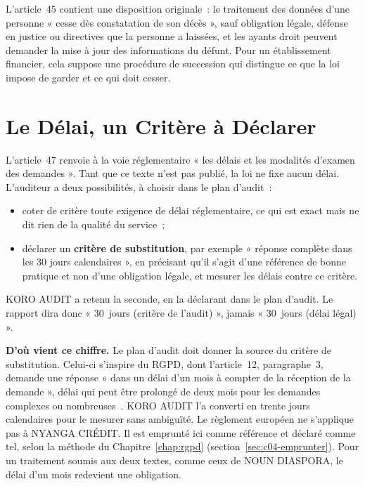 L'article~45 contient une disposition originale~: le traitement des données
d'une personne « cesse dès constatation de son décès », sauf obligation
légale, défense en justice ou directives que la personne a laissées, et les
ayants droit peuvent demander la mise à jour des informations du défunt.
Pour un établissement financier, cela suppose une procédure de succession
qui distingue ce que la loi impose de garder et ce qui doit cesser.

\section{Le Délai, un Critère à Déclarer}
\label{sec:c06-delai}

L'article~47 renvoie à la voie réglementaire « les délais et les modalités
d'examen des demandes ». Tant que ce texte n'est pas publié, la loi ne fixe
aucun délai. L'auditeur a deux possibilités, à choisir dans le plan
d'audit~:

\begin{itemize}
    \item coter \NEK{} de critère toute exigence de délai réglementaire, ce
          qui est exact mais ne dit rien de la qualité du service~;
    \item déclarer un \textbf{critère de substitution}, par exemple
          « réponse complète dans les 30 jours calendaires », en précisant
          qu'il s'agit d'une référence de bonne pratique et non d'une
          obligation légale, et mesurer les délais contre ce critère.
\end{itemize}

KORO AUDIT a retenu la seconde, en la déclarant dans le plan d'audit. Le
rapport dira donc « 30~jours (critère de l'audit) », jamais « 30~jours
(délai légal) ».

\textbf{D'où vient ce chiffre.} Le plan d'audit doit donner la source du
critère de substitution. Celui-ci s'inspire du RGPD, dont l'article~12,
paragraphe~3, demande une réponse « dans un délai d'un mois à compter de
la réception de la demande », délai qui peut être prolongé de deux mois
pour les demandes complexes ou nombreuses~\cite{ue2016rgpd}. KORO AUDIT
l'a converti en trente jours calendaires pour le mesurer sans ambiguïté.
Le règlement européen ne s'applique pas à NYANGA CRÉDIT. Il est emprunté
ici comme référence et déclaré comme tel, selon la méthode du
Chapitre~\ref{chap:rgpd} (section~\ref{sec:c04-emprunter}). Pour un
traitement soumis aux deux textes, comme ceux de NOUN DIASPORA, le délai
d'un mois redevient une obligation.

